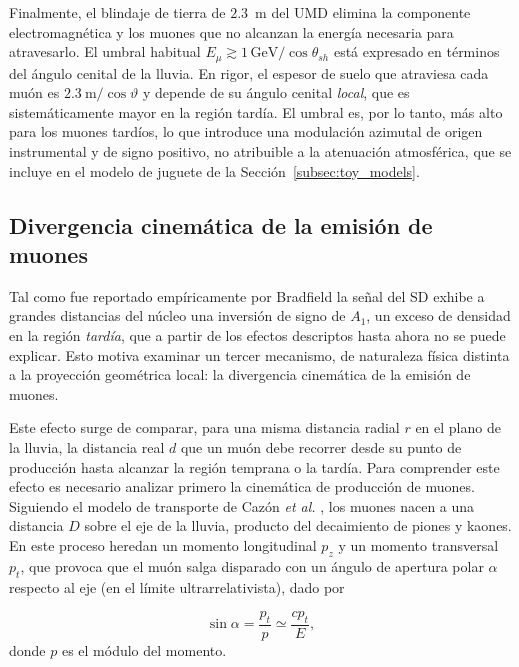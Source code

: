 Finalmente, el blindaje de tierra de $2.3$~m del UMD elimina la componente electromagnética y los muones que no alcanzan la energía necesaria para atravesarlo. El umbral habitual $E_\mu \gtrsim 1\,\mathrm{GeV}/\cos\theta_{sh}$ está expresado en términos del ángulo cenital de la lluvia. En rigor, el espesor de suelo que atraviesa cada muón es $2.3~\mathrm{m}/\cos\vartheta$ y depende de su ángulo cenital \textit{local}, que es sistemáticamente mayor en la región tardía. El umbral es, por lo tanto, más alto para los muones tardíos, lo que introduce una modulación azimutal de origen instrumental y de signo positivo, no atribuible a la atenuación atmosférica, que se incluye en el modelo de juguete de la Sección~\ref{subsec:toy_models}.

\subsection{Divergencia cinemática de la emisión de muones}
\label{subsubsec:divergencia_cinematica}

Tal como fue reportado empíricamente por Bradfield \cite{BradfieldThesis} la señal del SD exhibe a grandes distancias del núcleo una inversión de signo de $A_1$, un exceso de densidad en la región \textit{tardía}, que a partir de los efectos descriptos hasta ahora no se puede explicar. Esto motiva examinar un tercer mecanismo, de naturaleza física distinta a la proyección geométrica local: la divergencia cinemática de la emisión de muones.

Este efecto surge de comparar, para una misma distancia radial $r$ en el plano de la lluvia, la distancia real $d$ que un muón debe recorrer desde su punto de producción hasta alcanzar la región temprana o la tardía. Para comprender este efecto es necesario analizar primero la cinemática de producción de muones. Siguiendo el modelo de transporte de Cazón \textit{et al.} \cite{Cazon2012}, los muones nacen a una distancia $D$ sobre el eje de la lluvia, producto del decaimiento de piones y kaones. En este proceso heredan un momento longitudinal $p_z$ y un momento transversal $p_t$, que provoca que el muón salga disparado con un ángulo de apertura polar $\alpha$ respecto al eje (en el límite ultrarrelativista), dado por

\begin{equation}
	\sin\alpha = \frac{p_t}{p} \simeq \frac{cp_t}{E},
	\label{eq:cazon_alpha}
\end{equation}
%
donde $p$ es el módulo del momento.

